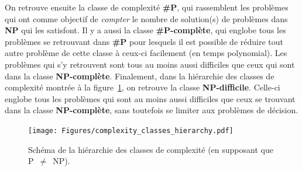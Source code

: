 On retrouve ensuite la classe de complexité \textbf{\#P}, qui rassemblent les problèmes qui ont comme objectif de \emph{compter} le nombre de solution(s) de problèmes dans \textbf{NP} qui les satisfont.
Il y a aussi la classe \textbf{\#P-complète}, qui englobe tous les problèmes se retrouvant dans \textbf{\#P} pour lesquels il est possible de réduire tout autre problème de cette classe à ceux-ci facilement (en temps polynomial).
Les problèmes qui s'y retrouvent sont tous au moins aussi difficiles que ceux qui sont dans la classe \textbf{NP-complète}.
Finalement, dans la hiérarchie des classes de complexité montrée à la figure~\ref{fig:complexites}, on retrouve la classe \textbf{NP-difficile}. 
Celle-ci englobe tous les problèmes qui sont au moins aussi difficiles que ceux se trouvant dans la classe \textbf{NP-complète}, sans toutefois se limiter aux problèmes de décision.
\begin{figure}[h]
    \centering
    \texttt{[image: Figures/complexity\_classes\_hierarchy.pdf]}
    \caption[Schéma de la hiérarchie des classes de complexité.]{Schéma de la hiérarchie des classes de complexité (en supposant que P~$\ne$~NP).}
    \label{fig:complexites}
\end{figure}



